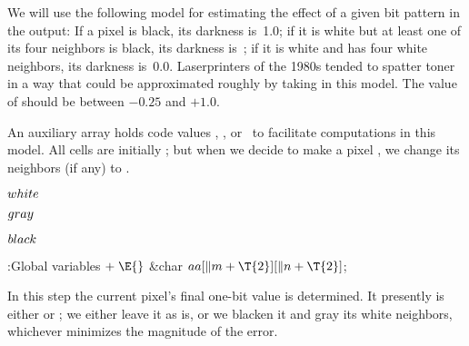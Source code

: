 We will use the following model for estimating the effect
of a given
bit pattern in the output: If a pixel is black, its darkness is~1.0;
if it is white but at least one of its four neighbors is black, its
darkness is~; if it is white and has four white neighbors, its
darkness is~0.0. Laserprinters of the 1980s tended to spatter toner
in a way that could be approximated roughly by taking 
in
this model. The value of  should be between $-0.25$ and $+1.0$.

An auxiliary array  holds code values
, , or~ to facilitate computations in
this model.
All cells are initially ; but when we decide to make a pixel
, we change its  neighbors (if any) to .

\Y\B\4\D$\\{white}$ \5
\par
\B\4\D$\\{gray}$ \5
\par
\B\4\D$\\{black}$ \5
\par
\Y\B\4:Global variables\X${}\mathrel+\E{}$\6
\&{char} ${}\\{aa}[\|m+\T{2}][\|n+\T{2}]{}$;\par
\fi

In this step the current pixel's final one-bit value is
determined.
It presently is either  or ; we either leave it as
is,
or we blacken it and gray its white neighbors, whichever minimizes the
magnitude of the error.

